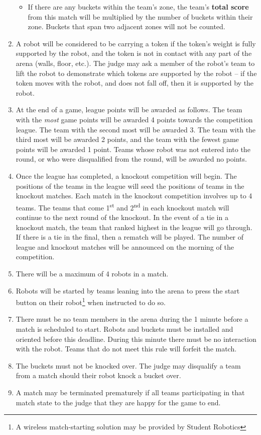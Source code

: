 \begin{enumerate}
\begin{itemize}
  \item If there are any buckets within the team's zone, the team's \textbf{total score} from this match will be multiplied by the number of buckets within their zone.  Buckets that span two adjacent zones will not be counted.

\end{itemize}

\item A robot will be considered to be carrying a token if the token's weight is fully supported by the robot, and the token is not in contact with any part of the arena (walls, floor, etc.).  The judge may ask a member of the robot's team to lift the robot to demonstrate which tokens are supported by the robot -- if the token moves with the robot, and does not fall off, then it is supported by the robot.

\item At the end of a game, league points will be awarded as follows.  The team with the \emph{most} game points will be awarded 4 points towards the competition league.
 The team with the second most will be awarded 3.
 The team with the third most will be awarded 2 points, and the team with the fewest game points will be awarded 1 point.
 Teams whose robot was not entered into the round, or who were disqualified from the round, will be awarded no points.

\item Once the league has completed, a knockout competition will begin.  The positions of the teams in the league will seed the positions of teams in the knockout matches.  Each match in the knockout competition involves up to 4 teams.  The teams that come 1\textsuperscript{st} and 2\textsuperscript{nd} in each knockout match will continue to the next round of the knockout.  In the event of a tie in a knockout match, the team that ranked highest in the league will go through.  If there is a tie in the final, then a rematch will be played.  The number of league and knockout matches will be announced on the morning of the competition.

\item There will be a maximum of 4 robots in a match.
\item Robots will be started by teams leaning into the arena to press the start button on their robot\footnote{A wireless match-starting solution may be provided by Student Robotics} when instructed to do so.

\item There must be no team members in the arena during the 1 minute before a match is scheduled to start.  Robots and buckets must be installed and oriented before this deadline.  During this minute there must be no interaction with the robot.  Teams that do not meet this rule will forfeit the match.

\item The buckets must not be knocked over.  The judge may disqualify a team from a match should their robot knock a bucket over.

\item A match may be terminated prematurely if all teams participating in that match state to the judge that they are happy for the game to end.

\end{enumerate}
